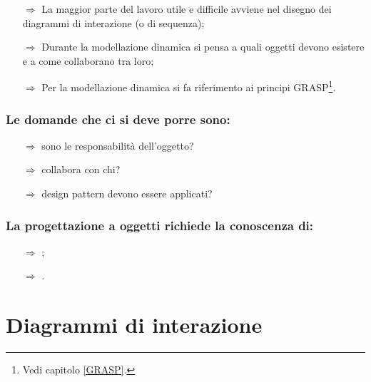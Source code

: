 \begin{itemize}
    \item [$\Rightarrow$] La maggior parte del lavoro utile e difficile
    avviene nel disegno dei diagrammi di interazione (o di sequenza);
    \item [$\Rightarrow$] Durante la modellazione dinamica si pensa
    a quali oggetti devono esistere e a come collaborano tra loro;
    \item [$\Rightarrow$] Per la modellazione dinamica si fa riferimento
    ai principi GRASP\footnote{Vedi capitolo \ref{GRASP}.}.
\end{itemize}

\subsubsection{Le domande che ci si deve porre sono:}

\begin{itemize}
    \item [$\Rightarrow$]  sono le responsabilità
    dell'oggetto?
    \item [$\Rightarrow$]  collabora con chi?
    \item [$\Rightarrow$]  design pattern devono essere applicati?
\end{itemize}

\subsubsection{La progettazione a oggetti richiede la conoscenza di:}

\begin{itemize}
    \item [$\Rightarrow$] ;
    \item [$\Rightarrow$] .
\end{itemize}

\section{Diagrammi di interazione}



